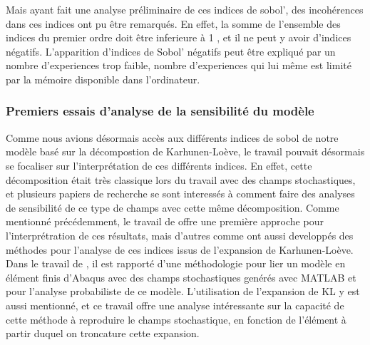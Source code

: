 \documentclass[a4paper,10pt]{article}
\begin{document}
Mais ayant fait une analyse préliminaire de ces indices de sobol', des incohérences dans ces indices ont pu être remarqués. En effet, la somme de l'ensemble des indices du premier ordre doit être inferieure à 1 , et il ne peut y avoir d'indices négatifs. L'apparition d'indices de Sobol' négatifs peut être expliqué par un nombre d'experiences trop faible, nombre d'experiences qui lui même est limité par la mémoire disponible dans l'ordinateur. %



\subsubsection{Premiers essais d'analyse de la sensibilité du modèle }

Comme nous avions désormais accès aux différents indices de sobol de notre modèle basé sur la décompostion de Karhunen-Loève, le travail pouvait désormais se focaliser sur l'interprétation de ces différents indices. En effet, cette décomposition était très classique lors du travail avec des champs stochastiques, et plusieurs papiers de recherche se sont interessés à comment faire des  analyses de sensibilité de ce type de champs avec cette même décomposition. Comme mentionné précédemment, le travail de \cite{Wei2017May} offre une première approche pour l'interprétration de ces résultats, mais d'autres comme \cite{Pronzato2019Jul} ont aussi developpés des méthodes pour l'analyse de ces indices issus de l'expansion de Karhunen-Loève. 
Dans le travail de \cite{shangStochastic2013}, il est rapporté d'une méthodologie pour lier un modèle en élément finis d'Abaqus avec des champs stochastiques genérés avec MATLAB et pour l'analyse probabiliste de ce modèle. L'utilisation de l'expansion de KL y est aussi mentionné, et ce travail offre une analyse intéressante sur la capacité de cette méthode à reproduire le champs stochastique, en fonction de l'élément à partir duquel on troncature cette expansion. 
\end{document}
